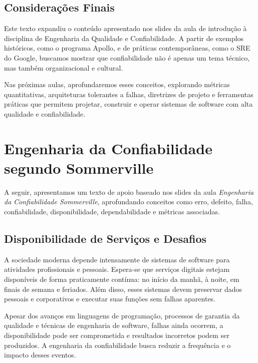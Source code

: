 \documentclass[12pt,a4paper]{report}
\begin{document}
\section*{Considerações Finais}

Este texto expandiu o conteúdo apresentado nos slides da aula de introdução à
disciplina de Engenharia da Qualidade e Confiabilidade. A partir de exemplos
históricos, como o programa Apollo, e de práticas contemporâneas, como o SRE
do Google, buscamos mostrar que confiabilidade não é apenas um tema técnico,
mas também organizacional e cultural.

Nas próximas aulas, aprofundaremos esses conceitos, explorando métricas
quantitativas, arquiteturas tolerantes a falhas, diretrizes de projeto e
ferramentas práticas que permitem projetar, construir e operar sistemas de
software com alta qualidade e confiabilidade.

\clearpage

\chapter{Engenharia da Confiabilidade segundo Sommerville} \cite{sommerville2019}

A seguir, apresentamos um texto de apoio baseado nos slides da aula
\emph{Engenharia da Confiabilidade Sommerville}, aprofundando conceitos como
erro, defeito, falha, confiabilidade, disponibilidade, dependabilidade e
métricas associadas.

\section{Disponibilidade de Serviços e Desafios}

A sociedade moderna depende intensamente de sistemas de software para
atividades profissionais e pessoais. Espera-se que serviços digitais estejam
disponíveis de forma praticamente contínua: no início da manhã, à noite, em
finais de semana e feriados. Além disso, esses sistemas devem preservar
dados pessoais e corporativos e executar suas funções sem falhas aparentes.

Apesar dos avanços em linguagens de programação, processos de garantia da
qualidade e técnicas de engenharia de software, falhas ainda ocorrem, a
disponibilidade pode ser comprometida e resultados incorretos podem ser
produzidos. A engenharia da confiabilidade busca reduzir a frequência e o
impacto desses eventos.
\end{document}

